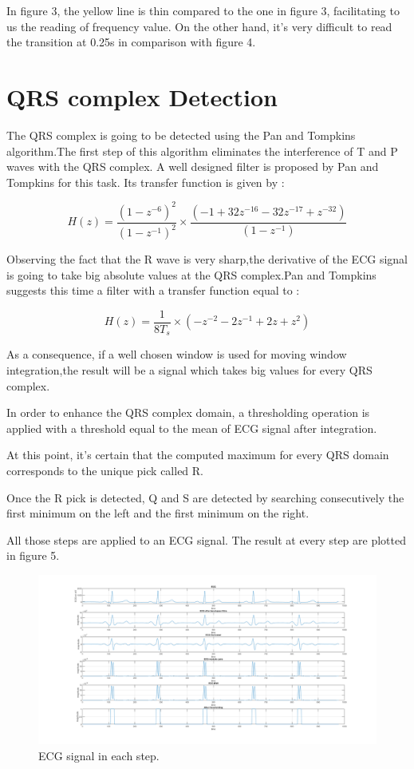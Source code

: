\documentclass{article}
\begin{document}
In figure 3, the yellow line is thin compared to the one in figure 3, facilitating to us the reading of frequency value. On the other hand, it’s very difficult to read the transition at 0.25s in comparison with figure 4.

\section{QRS complex Detection}

The QRS complex is going to be detected using the Pan and Tompkins algorithm.The first step of this algorithm eliminates the interference of T and P waves with the QRS complex. A well designed filter is proposed by Pan and Tompkins for this task. Its transfer function is given by :

\begin{equation}
    H(z) = \frac{(1-z^{-6})^{2}}{(1-z^{-1})^{2}}\times\frac{(-1 + 32z^{-16} -32z^{-17} +z^{-32})}{(1-z^{-1})}
\end{equation}

Observing the fact that the R wave is very sharp,the derivative of the ECG signal is going to take big absolute values at the QRS complex.Pan and Tompkins suggests this time a filter with a transfer function equal to :

\begin{equation}
    H(z) = \frac{1}{8T_s}\times(-z^{-2} - 2z^{-1} +2z +z^{2})
\end{equation}

As a consequence, if a well chosen window is used for moving window integration,the result will be a signal which takes big values for every QRS complex.

In order to enhance the QRS complex domain, a thresholding operation is applied with a threshold equal to the mean of ECG signal after integration.

At this point, it’s certain that the computed maximum for every QRS domain corresponds to the unique pick called R.

Once the R pick is detected, Q and S are detected by searching consecutively the first minimum on the left and the first minimum on the right.

All those steps are applied to an ECG signal. The result at every step are plotted in figure 5.


\begin{figure}[htbp]

\centerline{\includegraphics[scale = 0.4]{figure_5.png}}
\caption{ECG signal in each step.}

\end{figure}
\end{document}
